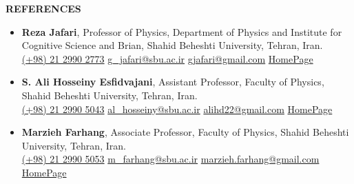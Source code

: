 \documentclass[12pt, b4paper]{cv}
\begin{document}

{\Large \textbf{REFERENCES}}

\begin{itemize}
	\item \textbf{Reza Jafari}, Professor of Physics, Department of Physics and Institute for Cognitive Science and Brian, Shahid Beheshti University, Tehran, Iran.\\
	\href{tel:(+98)2129902773}{ (+98) 21 2990 2773}
	\hspace{0.5in}
	\href{mailto:g\_jafari@sbu.ac.ir}{ g\_jafari@sbu.ac.ir}
	\hspace{0.75in}
	\href{mailto:gjafari@gmail.com}{ gjafari@gmail.com}
	\hspace{1.14in}
	\href{https://complexity.sbu.ac.ir/professor-reza-jafari/}{HomePage} 
	\item \textbf{S. Ali Hosseiny Esfidvajani}, Assistant Professor, Faculty of Physics, Shahid Beheshti University, Tehran, Iran.\\
	\href{tel:(+98)2129905043}{ (+98) 21 2990 5043}
	\hspace{0.5in}
	\href{mailto:al\_hosseiny@sbu.ac.ir}{ al\_hosseiny@sbu.ac.ir}
	\hspace{0.5in}
	\href{mailto:alihd22@gmail.com}{ alihd22@gmail.com}
	\hspace{1.091in}
	\href{https://alihosseiny.com/}{HomePage} 
	\item \textbf{Marzieh Farhang}, Associate Professor, Faculty of Physics, Shahid Beheshti University, Tehran, Iran.\\
	\href{tel:(+98)2129905053}{ (+98) 21 2990 5053}
	\hspace{0.5in}
	\href{mailto:m\_farhang@sbu.ac.ir}{ m\_farhang@sbu.ac.ir}
	\hspace{0.54in}
	\href{mailto:marzieh.farhang@gmail.com}{ marzieh.farhang@gmail.com}
	\hspace{0.5in}
	\href{https://en.sbu.ac.ir/~m_farhang/home}{HomePage} 
\end{itemize}
\end{document}
